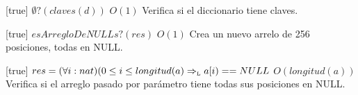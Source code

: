 \begin{Interfaz}
  [true]
  {$\emptyset?(claves(d))$}
  {$O(1)$}
  {Verifica si el diccionario tiene claves.}


  [true]
  {$esArregloDeNULLs?(res)$}
  {$O(1)$}
  {Crea un nuevo arrelo de 256 posiciones, todas en NULL.}

 
  
  [true]
  {$res = (\forall i: nat) (0 \leq i \leq longitud(a) \Rightarrow_{\mathrm{\scriptscriptstyle{L}}} a[i) == NULL$}
  {$O(longitud(a))$}
  {Verifica si el arreglo pasado por par\'ametro tiene todas sus posiciones en NULL.}


\end{Interfaz}

